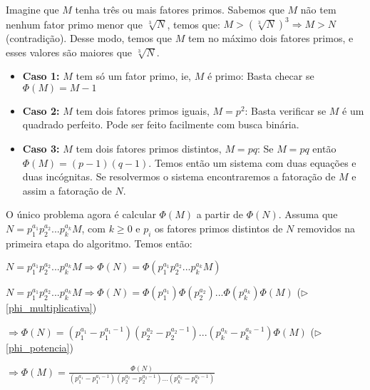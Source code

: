 Imagine que $M$ tenha três ou mais fatores primos. Sabemos que $M$ não tem nenhum fator primo menor que $\sqrt[3]{N}$, temos que: $M > (\sqrt[3]{N})^3 \Rightarrow M > N$ (contradição).
Desse modo, temos que $M$ tem no máximo dois fatores primos, e esses valores são maiores que $\sqrt[3]{N}$.

\begin{itemize}
  \item \textbf{Caso 1:} $M$ tem só um fator primo, ie, $M$ é primo:
		Basta checar se $\Phi(M) = M-1$

  \item \textbf{Caso 2:} $M$ tem dois fatores primos iguais, $M = p ^2$:
		Basta verificar se $M$ é um quadrado perfeito. Pode ser feito facilmente com busca binária.

  \item \textbf{Caso 3:} $M$ tem dois fatores primos distintos, $M = pq$:
		Se $M=pq$ então $\Phi(M) = (p-1)(q-1)$. Temos então um sistema com duas equações e duas incógnitas. Se resolvermos o sistema encontraremos a fatoração de $M$ e assim a fatoração de $N$.
\end{itemize}
O único problema agora é calcular $\Phi(M)$ a partir de $\Phi(N)$. Assuma que $N = p_1^{a_1}p_2^{a_2}...p_k^{a_k}M$, com $k \geq 0$ e 
 $p_i$ os fatores primos distintos de $N$ removidos na primeira etapa do algoritmo. Temos então:

$N = p_1^{a_1}p_2^{a_2}...p_k^{a_k}M \Rightarrow \Phi(N) = \Phi(p_1^{a_1}p_2^{a_2}...p_k^{a_k}M)$

$N = p_1^{a_1}p_2^{a_2}...p_k^{a_k}M \Rightarrow \Phi(N) = \Phi(p_1^{a_1})\Phi(p_2^{a_2})...\Phi(p_k^{a_k})\Phi(M)$ ($\triangleright$ \autoref{phi_multiplicativa})

$\Rightarrow \Phi(N) = (p_1^{a_1}-p_1^{a_1-1})(p_2^{a_2} - p_2^{a_2-1})...(p_k^{a_k}-p_k^{a_k-1})\Phi(M)$ ($\triangleright$ \autoref{phi_potencia})

$\Rightarrow \Phi(M) = \frac{\Phi(N)}{(p_1^{a_1}-p_1^{a_1-1})(p_2^{a_2} - p_2^{a_2-1})...(p_k^{a_k}-p_k^{a_k-1})}$
\\

